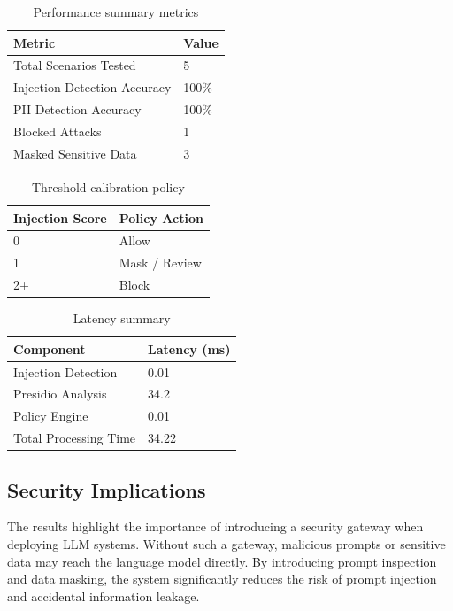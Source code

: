 \documentclass[conference]{IEEEtran}
\begin{document}
\begin{table}[h]
\centering
\begin{tabular}{|l|l|}
\hline
Metric & Value \\
\hline
Total Scenarios Tested & 5 \\
Injection Detection Accuracy & 100\% \\
PII Detection Accuracy & 100\% \\
Blocked Attacks & 1 \\
Masked Sensitive Data & 3 \\
\hline
\end{tabular}
\caption{Performance summary metrics}
\end{table}

\begin{table}[h]
\centering
\begin{tabular}{|l|l|}
\hline
Injection Score & Policy Action \\
\hline
0 & Allow \\
1 & Mask / Review \\
2+ & Block \\
\hline
\end{tabular}
\caption{Threshold calibration policy}
\end{table}

\begin{table}[h]
\centering
\begin{tabular}{|l|l|}
\hline
Component & Latency (ms) \\
\hline
Injection Detection & 0.01 \\
Presidio Analysis & 34.2 \\
Policy Engine & 0.01 \\
Total Processing Time & 34.22 \\
\hline
\end{tabular}
\caption{Latency summary}
\end{table}

\subsection{Security Implications}

The results highlight the importance of introducing a security gateway when deploying LLM systems. Without such a gateway, malicious prompts or sensitive data may reach the language model directly. By introducing prompt inspection and data masking, the system significantly reduces the risk of prompt injection and accidental information leakage.
\end{document}
